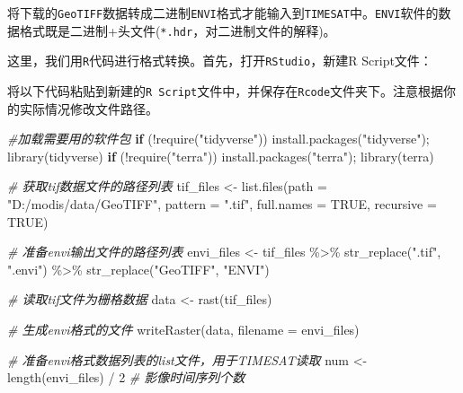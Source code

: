 \documentclass[
]{article}
\newenvironment{Shaded}{\begin{snugshade}}{\end{snugshade}}
\newcommand{\AttributeTok}[1]{\textcolor[rgb]{0.77,0.63,0.00}{#1}}
\newcommand{\CommentTok}[1]{\textcolor[rgb]{0.56,0.35,0.01}{\textit{#1}}}
\newcommand{\ConstantTok}[1]{\textcolor[rgb]{0.00,0.00,0.00}{#1}}
\newcommand{\ControlFlowTok}[1]{\textcolor[rgb]{0.13,0.29,0.53}{\textbf{#1}}}
\newcommand{\DecValTok}[1]{\textcolor[rgb]{0.00,0.00,0.81}{#1}}
\newcommand{\FunctionTok}[1]{\textcolor[rgb]{0.00,0.00,0.00}{#1}}
\newcommand{\NormalTok}[1]{#1}
\newcommand{\OtherTok}[1]{\textcolor[rgb]{0.56,0.35,0.01}{#1}}
\newcommand{\SpecialCharTok}[1]{\textcolor[rgb]{0.00,0.00,0.00}{#1}}
\newcommand{\StringTok}[1]{\textcolor[rgb]{0.31,0.60,0.02}{#1}}
\begin{document}
将下载的\texttt{GeoTIFF}数据转成二进制\texttt{ENVI}格式才能输入到\texttt{TIMESAT}中。\texttt{ENVI}软件的数据格式既是二进制+头文件(\texttt{*.hdr}，对二进制文件的解释)。

这里，我们用\texttt{R}代码进行格式转换。首先，打开\texttt{RStudio}，新建R
Script文件：

将以下代码粘贴到新建的\texttt{R\ Script}文件中，并保存在\texttt{Rcode}文件夹下。注意根据你的实际情况修改文件路径。

\begin{Shaded}
\begin{Highlighting}[]
\CommentTok{\#加载需要用的软件包}
\ControlFlowTok{if}\NormalTok{ (}\SpecialCharTok{!}\FunctionTok{require}\NormalTok{(}\StringTok{"tidyverse"}\NormalTok{)) }\FunctionTok{install.packages}\NormalTok{(}\StringTok{"tidyverse"}\NormalTok{); }\FunctionTok{library}\NormalTok{(tidyverse)}
\ControlFlowTok{if}\NormalTok{ (}\SpecialCharTok{!}\FunctionTok{require}\NormalTok{(}\StringTok{"terra"}\NormalTok{)) }\FunctionTok{install.packages}\NormalTok{(}\StringTok{"terra"}\NormalTok{); }\FunctionTok{library}\NormalTok{(terra)}

\CommentTok{\# 获取tif数据文件的路径列表}
\NormalTok{tif\_files }\OtherTok{\textless{}{-}} \FunctionTok{list.files}\NormalTok{(}\AttributeTok{path =} \StringTok{"D:/modis/data/GeoTIFF"}\NormalTok{, }
                        \AttributeTok{pattern =} \StringTok{".tif"}\NormalTok{,}
                        \AttributeTok{full.names =} \ConstantTok{TRUE}\NormalTok{,}
                        \AttributeTok{recursive =} \ConstantTok{TRUE}\NormalTok{)}

\CommentTok{\# 准备envi输出文件的路径列表}
\NormalTok{envi\_files }\OtherTok{\textless{}{-}}\NormalTok{ tif\_files }\SpecialCharTok{\%\textgreater{}\%} \FunctionTok{str\_replace}\NormalTok{(}\StringTok{".tif"}\NormalTok{, }\StringTok{".envi"}\NormalTok{) }\SpecialCharTok{\%\textgreater{}\%} 
  \FunctionTok{str\_replace}\NormalTok{(}\StringTok{"GeoTIFF"}\NormalTok{, }\StringTok{"ENVI"}\NormalTok{)}

\CommentTok{\# 读取tif文件为栅格数据}
\NormalTok{data }\OtherTok{\textless{}{-}} \FunctionTok{rast}\NormalTok{(tif\_files)}

\CommentTok{\# 生成envi格式的文件}
\FunctionTok{writeRaster}\NormalTok{(data, }\AttributeTok{filename =}\NormalTok{ envi\_files)}

\CommentTok{\# 准备envi格式数据列表的list文件，用于TIMESAT读取}
\NormalTok{num }\OtherTok{\textless{}{-}} \FunctionTok{length}\NormalTok{(envi\_files) }\SpecialCharTok{/} \DecValTok{2} \CommentTok{\# 影像时间序列个数}


\end{Highlighting}
\end{Shaded}
\end{document}
